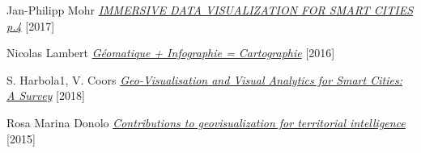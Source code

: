 \documentclass[french, a4paper, 12pt]{report}
\begin{document}
\begin{thebibliography}{9}
 Jan-Philipp Mohr \href{https://hashplay.net/wp-content/uploads/2017/11/HASHPLAY-Smart-City-whitepaper-v2.pdf}{\emph{IMMERSIVE DATA VISUALIZATION
FOR SMART CITIES p.4}} [2017]


 Nicolas Lambert \href{https://neocarto.hypotheses.org/2068}{\emph{Géomatique + Infographie = Cartographie}} [2016]

 S. Harbola1, V. Coors \href{https://www.researchgate.net/publication/327785603_GEO-VISUALISATION_AND_VISUAL_ANALYTICS_FOR_SMART_CITIES_A_SURVEY}{\emph{Geo-Visualisation and Visual Analytics for Smart Cities: A Survey}} [2018]

 Rosa Marina Donolo \href{http://theses.insa-lyon.fr/publication/2014ISAL0075/these.pdf}{\emph{Contributions to geovisualization for territorial intelligence}} [2015]


\end{thebibliography}
\end{document}
